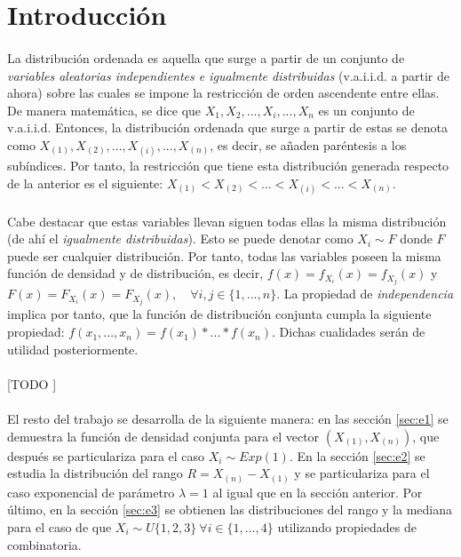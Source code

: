 \documentclass{article}
\begin{document}
  \maketitle


  \section{Introducción}

    \paragraph{}
    La distribución ordenada es aquella que surge a partir de un conjunto de \emph{variables aleatorias independientes e igualmente distribuidas} (v.a.i.i.d. a partir de ahora) sobre las cuales se impone la restricción de orden ascendente entre ellas. De manera matemática, se dice que $X_{1}, X_{2},...,X_{i}, ..., X_{n}$ es un conjunto de v.a.i.i.d. Entonces, la distribución ordenada que surge a partir de estas se denota como $X_{(1)}, X_{(2)}, ...,X_{(i)} ,..., X_{(n)}$, es decir, se añaden paréntesis a los subíndices. Por tanto, la restricción que tiene esta distribución generada respecto de la anterior es el siguiente: $X_{(1)} <  X_{(2)} < ... < X_{(i)} < ... < X_{(n)}$.

    \paragraph{}
    Cabe destacar que estas variables llevan siguen todas ellas la misma distribución (de ahí el \emph{igualmente distribuidas}). Esto se puede denotar como $X_{i} \sim F$ donde $F$ puede ser cualquier distribución. Por tanto, todas las variables poseen la misma función de densidad y de distribución, es decir, $f(x) = f_{X_i}(x) = f_{X_j}(x)$ y $F(x) = F_{X_i}(x) = F_{X_j}(x), \quad \forall i,j \in \{1,..., n\}$. La propiedad de \emph{independencia} implica por tanto, que la función de distribución conjunta cumpla la siguiente propiedad: $f(x_1, ..., x_n) = f(x_1) * ... * f(x_n)$. Dichas cualidades serán de utilidad posteriormente.

    \paragraph{}
    [TODO ]

    \paragraph{}
    El resto del trabajo se desarrolla de la siguiente manera: en las sección \ref{sec:e1} se demuestra la función de densidad conjunta para el vector $(X_{(1)}, X_{(n)})$, que después se particulariza para el caso $X_i \sim Exp(1)$. En la sección \ref{sec:e2} se estudia la distribución del rango $R = X_{(n)} - X_{(1)}$ y se particulariza para el caso exponencial de parámetro $\lambda=1$ al igual que en la sección anterior. Por último, en la sección \ref{sec:e3} se obtienen las distribuciones del rango y la mediana para el caso de que $X_i \sim U\{1,2,3\} \ \forall i  \in \{1,...,4\}$ utilizando propiedades de combinatoria.
\end{document}
